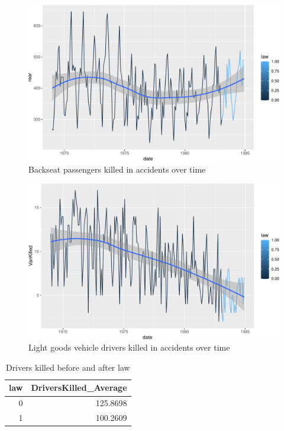 \documentclass[11pt,a4paper,]{article}
\begin{document}
\begin{figure}
\centering
\includegraphics{report_files/figure-latex/RearKilled-1.pdf}
\caption{\label{fig:RearKilled}Backseat passengers killed in accidents over time}
\end{figure}

\begin{figure}
\centering
\includegraphics{report_files/figure-latex/VanKilled-1.pdf}
\caption{\label{fig:VanKilled}Light goods vehicle drivers killed in accidents over time}
\end{figure}

\begin{table}

\caption{\label{tab:DriverTable}Drivers killed before and after law}
\centering
\begin{tabular}[t]{r|r}
\hline
law & DriversKilled\_Average\\
\hline
0 & 125.8698\\
\hline
1 & 100.2609\\
\hline
\end{tabular}
\end{table}
\end{document}
